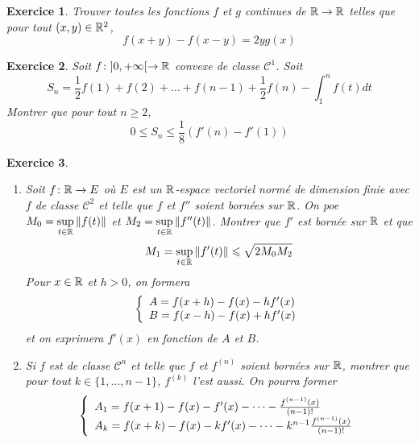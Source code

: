 \documentclass[12pt]{article}
\newtheorem{exercise}{Exercice}[section]
\theoremstyle{remark}
\theoremstyle{remark}
\begin{document}
\begin{exercise}
	Trouver toutes les fonctions $f$ et $g$ continues de $\mathbb{R}\to\mathbb{R}$ telles que pour tout $(x,y)\in\mathbb{R}^{2}$,
	$$f(x+y)-f(x-y)=2yg(x)$$
\end{exercise}

\begin{exercise}
	Soit $f\colon]0,+\infty[\to\mathbb{R}$ convexe de classe $\mathcal{C}^{1}$. Soit 
	$$S_{n}=\frac{1}{2}f(1)+f(2)+\dots+f(n-1)+\frac{1}{2}f(n)-\int_{1}^{n}f(t)dt$$
	Montrer que pour tout $n\geqslant2$, 
	$$0\leqslant S_{n}\leqslant\frac{1}{8}(f'(n)-f'(1))$$
\end{exercise}

\begin{exercise}
	\phantom{}
	\begin{enumerate}
		\item Soit $f\colon\mathbb{R}\to E$ où $E$ est un $\mathbb{R}$-espace vectoriel normé de dimension finie avec $f$ de classe $\mathcal{C}^{2}$ et telle que $f$ et $f''$ soient bornées sur $\mathbb{R}$. On poe $M_{0}=\sup\limits_{t\in\mathbb{R}}\Vert f(t)\Vert$ et $M_{2}=\sup\limits_{t\in\mathbb{R}}\Vert f''(t)\Vert$. Montrer que $f'$ est bornée sur $\mathbb{R}$ et que 
		$$M_{1}=\sup\limits_{t\in\mathbb{R}}\Vert f'(t)\Vert\leqslant\sqrt{2M_{0}M_{2}}$$
		Pour $x\in\mathbb{R}$ et $h>0$, on formera 
		$$
		\left\{
			\begin{array}[]{l}
				A=f(x+h)-f(x)-hf'(x)\\
				B=f(x-h)-f(x)+hf'(x)
			\end{array}
		\right.
		$$
		et on exprimera $f'(x)$ en fonction de $A$ et $B$.

		\item Si $f$ est de classe $\mathcal{C}^{n}$ et telle que $f$ et $f^{(n)}$ soient bornées sur $\mathbb{R}$, montrer que pour tout $k\in\{1,\dots,n-1\}$, $f^{(k)}$ l'est aussi. On pourra former 
		$$
		\left\{
			\begin{array}[]{l}
				A_{1}=f(x+1)-f(x)-f'(x)-\dots-\frac{f^{(n-1)}(x)}{(n-1)!}\\
				A_{k}=f(x+k)-f(x)-kf'(x)-\dots-k^{n-1}\frac{f^{(n-1)}(x)}{(n-1)!}
			\end{array}
		\right.
		$$
	\end{enumerate}
\end{exercise}
\end{document}
